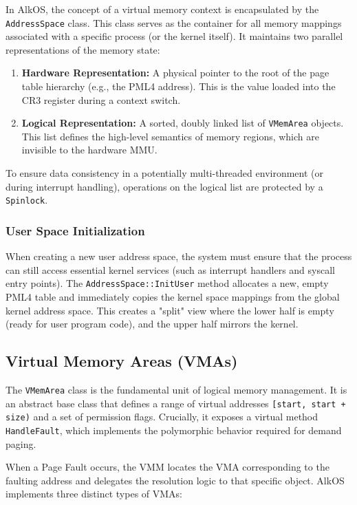 \documentclass[a4paper,10pt,twoside]{report}
\theoremstyle{definition}
\begin{document}
In AlkOS, the concept of a virtual memory context is encapsulated by the \texttt{AddressSpace} class. This class serves as the container for all memory mappings associated with a specific process (or the kernel itself). It maintains two parallel representations of the memory state:

\begin{enumerate}
    \item \textbf{Hardware Representation:} A physical pointer to the root of the page table hierarchy (e.g., the PML4 address). This is the value loaded into the CR3 register during a context switch.
    \item \textbf{Logical Representation:} A sorted, doubly linked list of \texttt{VMemArea} objects. This list defines the high-level semantics of memory regions, which are invisible to the hardware MMU.
\end{enumerate}

To ensure data consistency in a potentially multi-threaded environment (or during interrupt handling), operations on the logical list are protected by a \texttt{Spinlock}.

\subsubsection{User Space Initialization}

When creating a new user address space, the system must ensure that the process can still access essential kernel services (such as interrupt handlers and syscall entry points). The \texttt{AddressSpace::InitUser} method allocates a new, empty PML4 table and immediately copies the kernel space mappings from the global kernel address space. This creates a "split" view where the lower half is empty (ready for user program code), and the upper half mirrors the kernel.

\subsection{Virtual Memory Areas (VMAs)}

The \texttt{VMemArea} class is the fundamental unit of logical memory management. It is an abstract base class that defines a range of virtual addresses \texttt{[start, start + size)} and a set of permission flags. Crucially, it exposes a virtual method \texttt{HandleFault}, which implements the polymorphic behavior required for demand paging.

When a Page Fault occurs, the VMM locates the VMA corresponding to the faulting address and delegates the resolution logic to that specific object. AlkOS implements three distinct types of VMAs:
\end{document}
